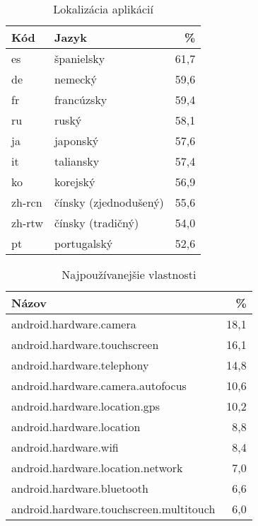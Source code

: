 \begin{table}[htb]
\centering
  \begin{tabular}{|l l r|}
    \hline
    \textbf{Kód} & \textbf{Jazyk} &  \textbf{\%} \\\hline\hline
    es & španielsky & 61,7 \\
    de & nemecký & 59,6 \\
    fr & francúzsky & 59,4 \\
    ru & ruský & 58,1 \\
    ja & japonský & 57,6 \\
    it & taliansky & 57,4 \\
	ko & korejský & 56,9 \\
	zh-rcn & čínsky (zjednodušený) & 55,6\\
	zh-rtw & čínsky (tradičný)& 54,0\\
	pt & portugalský & 52,6\\
    \hline
  \end{tabular}
  \caption{Lokalizácia aplikácií}
  \label{tab:language}
\end{table}

\begin{table}[htb]
\centering
  \begin{tabular}{|l r|}
    \hline
    \textbf{Názov} & \textbf{\%} \\\hline\hline
    android.hardware.camera & 18,1 \\
    android.hardware.touchscreen & 16,1 \\
    android.hardware.telephony & 14,8 \\
    android.hardware.camera.autofocus & 10,6 \\
    android.hardware.location.gps & 10,2 \\
    android.hardware.location & 8,8 \\
    android.hardware.wifi & 8,4 \\
    android.hardware.location.network & 7,0\\
    android.hardware.bluetooth & 6,6\\
    android.hardware.touchscreen.multitouch & 6,0\\
    \hline
  \end{tabular}
  \caption{Najpoužívanejšie vlastnosti}
  \label{tab:features}
\end{table}

